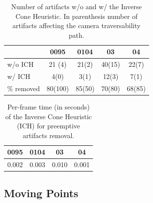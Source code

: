 \begin{table}[t]
  \caption{Number of artifacts w/o and w/ the Inverse Cone Heuristic. In parenthesis number of artifacts affecting the camera traversability path.}
   \label{tab:numArtifacts}
   \centering
   \begin{tabular}{p{}cccc}
   \toprule 
                               & 0095  & 0104& 03 & 04   \\
   \hline
   w/o ICH                 & 21 (4) &21(2)& 40(15)& 22(7)\\
   w/  ICH                    & 4(0) &3(1)& 12(3)& 7(1)\\
 \% removed                 & 80(100) &85(50)& 70(80)& 68(85)\\
    \bottomrule
  \end{tabular}
  \end{table}
  



\begin{table}[t]
  \caption{Per-frame time (in seconds) of the Inverse Cone Heuristic (ICH) for preemptive artifacts removal.}
   \label{tab:inverseTiming}
   \centering
   \begin{tabular}{cccc}
   \toprule  
     0095  & 0104&03 & 04     \\
   \hline
     0.002 & 0.003& 0.010 & 0.001  \\
    \bottomrule
  \end{tabular}
  \end{table} 


\subsection{Moving Points}


